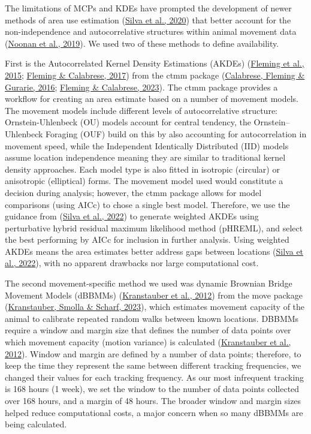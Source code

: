 \documentclass[10pt,a4paper]{article}
\begin{document}
The limitations of MCPs and KDEs have prompted the development of newer methods of area use estimation (\protect\hyperlink{ref-silva_reptiles_2020}{Silva et al., 2020}) that better account for the non-independence and autocorrelative structures within animal movement data (\protect\hyperlink{ref-Noonan2018}{Noonan et al., 2019}).
We used two of these methods to define availability.

First is the Autocorrelated Kernel Density Estimations (AKDEs) (\protect\hyperlink{ref-Fleming2015}{Fleming et al., 2015}; \protect\hyperlink{ref-Fleming2017}{Fleming \& Calabrese, 2017}) from the ctmm package (\protect\hyperlink{ref-Calabrese2016}{Calabrese, Fleming \& Gurarie, 2016}; \protect\hyperlink{ref-ctmm}{Fleming \& Calabrese, 2023}).
The ctmm package provides a workflow for creating an area estimate based on a number of movement models.
The movement models include different levels of autocorrelative structure: Ornstein-Uhlenbeck (OU) models account for central tendency, the Ornstein--Uhlenbeck Foraging (OUF) build on this by also accounting for autocorrelation in movement speed, while the Independent Identically Distributed (IID) models assume location independence meaning they are similar to traditional kernel density approaches.
Each model type is also fitted in isotropic (circular) or anisotropic (elliptical) forms.
The movement model used would constitute a decision during analysis; however, the ctmm package allows for model comparisons (using AICc) to chose a single best model.
Therefore, we use the guidance from (\protect\hyperlink{ref-silva_autocorrelationinformed_2022}{Silva et al., 2022}) to generate weighted AKDEs using perturbative hybrid residual maximum likelihood method (pHREML), and select the best performing by AICc for inclusion in further analysis.
Using weighted AKDEs means the area estimates better address gaps between locations (\protect\hyperlink{ref-silva_autocorrelationinformed_2022}{Silva et al., 2022}), with no apparent drawbacks nor large computational cost.

The second movement-specific method we used was dynamic Brownian Bridge Movement Models (dBBMMs) (\protect\hyperlink{ref-Kranstauber2012}{Kranstauber et al., 2012}) from the move package (\protect\hyperlink{ref-move}{Kranstauber, Smolla \& Scharf, 2023}), which estimates movement capacity of the animal to calibrate repeated random walks between known locations.
DBBMMs require a window and margin size that defines the number of data points over which movement capacity (motion variance) is calculated (\protect\hyperlink{ref-Kranstauber2012}{Kranstauber et al., 2012}).
Window and margin are defined by a number of data points; therefore, to keep the time they represent the same between different tracking frequencies, we changed their values for each tracking frequency.
As our most infrequent tracking is 168 hours (1 week), we set the window to the number of data points collected over 168 hours, and a margin of 48 hours.
The broader window and margin sizes helped reduce computational costs, a major concern when so many dBBMMs are being calculated.
\end{document}
